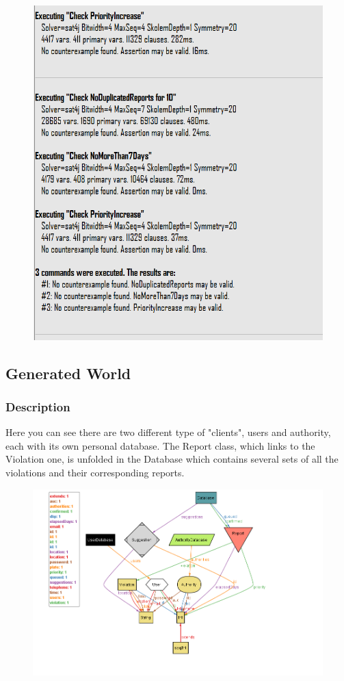 \documentclass[12pt,a4paper]{article}
\begin{document}
			\begin{figure}[H]
				\centering
				\includegraphics[width=1.2\linewidth]{images/exports/user/Checks.png}
				\label{fig:check}
			\end{figure}
\subsection{Generated World}
\subsubsection{Description}
Here you can see there are two different type of "clients", users and authority, each with its own personal database.\newline
The Report class, which links to the Violation one, is unfolded in the Database which contains several sets of all the violations and their corresponding reports.
\begin{figure}[H]
				\centering
				\includegraphics[width=1.5\linewidth]{images/exports/user/GeneratedWorld.png}
				\label{fig:GenWorld}
			\end{figure}
\newpage
\end{document}
